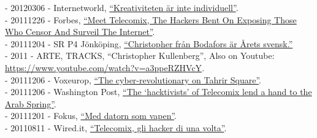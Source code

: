 \documentclass[a4paper,11pt,oneside]{article}
\begin{document}
{    - 20120306 - Internetworld, \href{http://www.idg.se/2.1085/1.435933/kreativiteten-ar-inte-individuell}{``Kreativiteten är inte individuell''}. \\
    - 20111226 - Forbes, \href{http://www.forbes.com/sites/andygreenberg/2011/12/26/meet-telecomix-the-hackers-bent-on-exposing-those-who-censor-and-surveil-the-internet/}{``Meet Telecomix, The Hackers Bent On Exposing Those Who Censor And Surveil The Internet''}. \\
    - 20111204 - SR P4 Jönköping, \href{http://t.sr.se/1gy095E}{``Christopher från Bodafors är Årets svensk.''} \\
    - 2011 - ARTE, TRACKS, ``Christopher Kullenberg'', Also on Youtube: \href{https://www.youtube.com/watch?v=a3ppeRZHVcY}{https://www.youtube.com/watch?v=a3ppeRZHVcY}.\\
    - 20111206 - Voxeurop, \href{http://www.voxeurop.eu/en/content/article/1254651-cyber-revolutionary-tahrir-square}{``The cyber-revolutionary on Tahrir Square''}. \\
    - 20111206 - Washington Post, \href{https://www.washingtonpost.com/lifestyle/style/the-hacktivists-of-telecomix-lend-a-hand-to-the-arab-spring/2011/12/05/gIQAAosraO_story.html}{``The ‘hacktivists’ of Telecomix lend a hand to the Arab Spring''}. \\
    - 20111201 - Fokus, \href{http://www.fokus.se/2011/12/med-datorn-som-vapen/}{``Med datorn som vapen''}. \\
    - 20110811 - Wired.it, \href{http://daily.wired.it/news/internet/2011/08/11/telecomix-hacker-egitto-tunisia-iran-13861.html}{``Telecomix, gli hacker di una volta''}. \\
}
\end{document}
